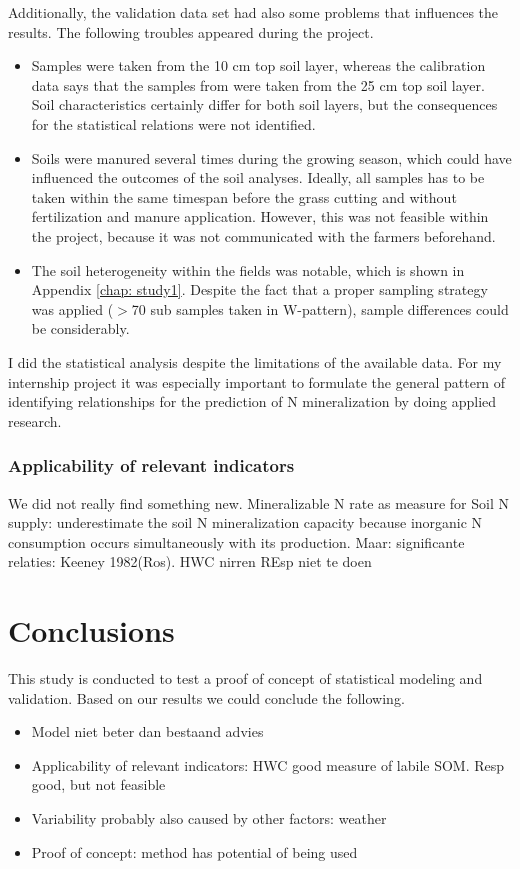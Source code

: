 \documentclass[10pt,twoside,dutch,english]{report}
\begin{document}
   Additionally, the validation data set had also some problems that influences the results. The following troubles appeared during the project.
		   \begin{itemize}
	\item Samples were taken from the 10 cm top soil layer, whereas the calibration data says that the samples from \citet{Echeverri2014} were taken from the 25 cm top soil layer. Soil characteristics certainly differ for both soil layers, but the consequences for the statistical relations were not identified. 
   	\item Soils were manured several times during the growing season, which could have influenced the outcomes of the soil analyses. Ideally, all samples has to be taken within the same timespan before the grass cutting and without fertilization and manure application. However, this was not feasible within the project, because it was not communicated with the farmers beforehand.
   	\item The soil heterogeneity within the fields was notable, which is shown in Appendix \ref{chap: study1}. Despite the fact that a proper sampling strategy was applied ($>$70 sub samples taken in W-pattern), sample differences could be considerably. 
   \end{itemize}
   
   I did the statistical analysis despite the limitations of the available data. For my internship project it was especially important to formulate the general pattern of identifying relationships for the prediction of N mineralization by doing applied research. 
   
	\subsection{Applicability of relevant indicators}
    We did not really find something new. 
    Mineralizable N rate as measure for Soil N supply: underestimate the soil N mineralization capacity because inorganic N consumption occurs simultaneously with its production. Maar: significante relaties: Keeney 1982(Ros). 
    HWC nirren
    REsp niet te doen

\chapter{Conclusions }

This study is conducted to test a proof of concept of statistical modeling and validation. Based on our results we could conclude the following. 
\begin{itemize}
\item Model niet beter dan bestaand advies
\item Applicability of relevant indicators: HWC good measure of labile SOM. Resp good, but not feasible
\item Variability probably also caused by other factors: weather
\item Proof of concept: method has potential of being used
\end{itemize}
\end{document}
